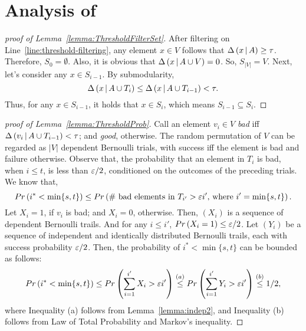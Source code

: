 \section{Analysis of \threseq} \label{apx:threseq}
\ThresholdFilterSet*
\begin{proof}[proof of Lemma~\ref{lemma:ThresholdFilterSet}]
    After filtering on Line~\ref{line:threshold-filtering},
    any element $x \in V$ follows that $\Delta \left( x \, | \, A \right) \ge \tau$.
    Therefore, $S_0 = \emptyset$.
    Also, it is obvious that $\Delta \left( x \, | \, A\cup V \right)=0$.
    So, $S_{|V|} = V$.
    Next, let's consider any $x \in S_{i-1}$.
    By submodularity,
    $$\Delta \left( x \, | \, A \cup T_i \right) \le \Delta \left( x \, | \, A\cup T_{i-1} \right)< \tau.$$
    Thus, for any $x \in S_{i-1}$, it holds that $x \in S_i$,
    which means $S_{i-1} \subseteq S_i$.
\end{proof}
\ThresholdProb*
\begin{proof}[proof of Lemma~\ref{lemma:ThresholdProb}]
    Call an element $v_i \in V$ \textit{bad} iff
    $\Delta \left( v_i \, | \, A\cup T_{i-1} \right) < \tau$;
	and \textit{good}, otherwise.
    The random permutation of $V$ can be regarded
    as $|V|$ dependent Bernoulli trials, with success
    iff the element is bad and failure otherwise.
	Observe that, the probability that an element in $T_i$ is bad,
	when $i \le t$,
	is less than $\varepsilon/2$, conditioned on the outcomes of the 
	preceding trials.
    We know that,
    $$Pr \left( i^* < \min\{s,t\} \right) \le Pr \left( \#\text{ bad elements in }
    T_{i'} > \varepsilon i' \text{, where } i' = \min\{s,t\} \right).$$
    Let $X_i=1$, if $v_i$ is bad; and $X_i=0$, otherwise.
    Then, $(X_i)$ is a sequence of
    dependent Bernoulli trails.
    And for any $i \le i'$,
    $Pr \left( X_i = 1 \right) \le \varepsilon/2$.
    Let $(Y_i)$ be a sequence of independent and identically distributed Bernoulli trails,
    each with success probability $\varepsilon/2$.
    Then, the probability of $i^* < \min\{s,t\}$ can be bounded as follows:
    $$Pr \left( i^* < \min\{s,t\} \right) 
    \le Pr \left( \sum_{i=1}^{i'} X_i > \varepsilon i' \right) \overset{(a)}{\le}
    Pr \left( \sum_{i=1}^{i'} Y_i > \varepsilon i' \right) \overset{(b)}{\le} 1/2, $$
    where Inequality (a) follows from Lemma~\ref{lemma:indep2},
    and Inequality (b) follows from Law of Total Probability
    and Markov's inequality.
\end{proof}
